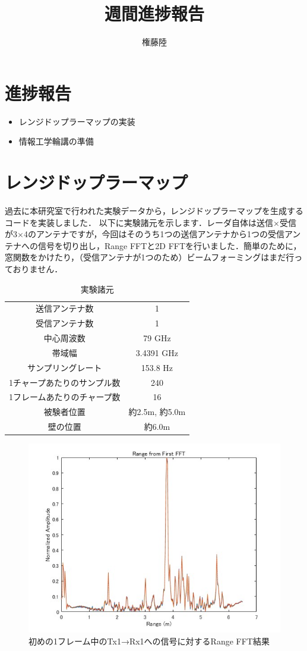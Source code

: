 \documentclass[dvipdfmx]{jsarticle}
\begin{document}
\title{週間進捗報告}
\author{権藤陸}
\maketitle
\section{進捗報告}
\begin{itemize}
    \item レンジドップラーマップの実装
    \item 情報工学輪講の準備
\end{itemize}

\section{レンジドップラーマップ}
過去に本研究室で行われた実験データから，レンジドップラーマップを生成するコードを実装しました．
以下に実験諸元を示します．レーダ自体は送信×受信が3×4のアンテナですが，今回はそのうち1つの送信アンテナから1つの受信アンテナへの信号を切り出し，Range FFTと2D FFTを行いました．簡単のために，窓関数をかけたり，（受信アンテナが1つのため）ビームフォーミングはまだ行っておりません．

\begin{table}[H]
\caption{実験諸元}
\centering
\begin{tabular}{cc}
\hline
送信アンテナ数 & 1 \\
受信アンテナ数 & 1 \\
中心周波数 & 79 GHz \\
帯域幅 & 3.4391 GHz \\
サンプリングレート & 153.8 Hz \\
1チャープあたりのサンプル数 & 240 \\
1フレームあたりのチャープ数 & 16 \\
被験者位置 & 約2.5m, 約5.0m \\
壁の位置 & 約6.0m \\
\hline
\end{tabular}
\end{table}

\begin{figure}[H]
\begin{center}
\includegraphics[width=0.8\linewidth]{./img/range_fft_no2division.jpg}
\end{center}
\caption{初めの1フレーム中のTx1→Rx1への信号に対するRange FFT結果}
\end{figure}
\end{document}

